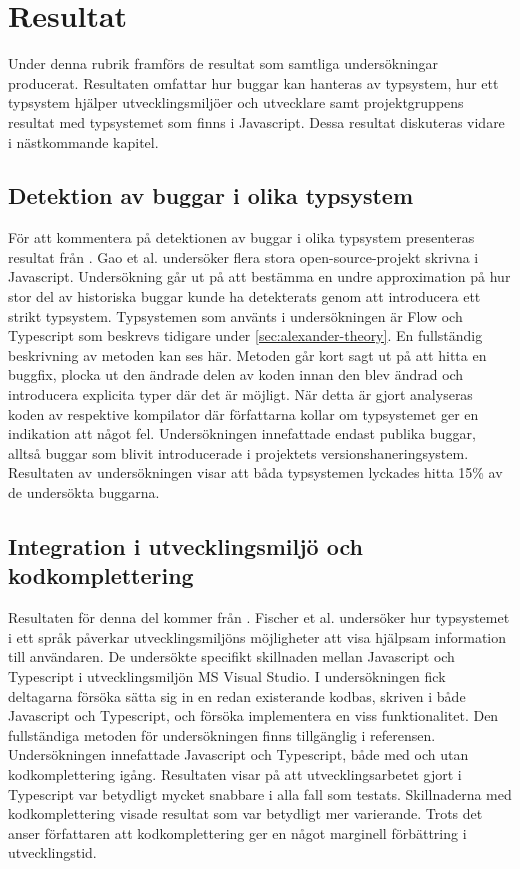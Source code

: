 \section{Resultat}
\label{sec:alexander-results}

Under denna rubrik framförs de resultat som samtliga undersökningar producerat. Resultaten omfattar hur buggar kan hanteras av typsystem, hur ett typsystem hjälper utvecklingsmiljöer och utvecklare samt projektgruppens resultat med typsystemet som finns i Javascript. Dessa resultat diskuteras vidare i nästkommande kapitel.

\subsection{Detektion av buggar i olika typsystem}
För att kommentera på detektionen av buggar i olika typsystem presenteras resultat från \cite{type-or-not-proceed}. Gao et al. undersöker flera stora open-source-projekt skrivna i Javascript.  Undersökning går ut på att bestämma en undre approximation på hur stor del av historiska buggar kunde ha detekterats genom att introducera ett strikt typsystem. Typsystemen som använts i undersökningen är Flow och Typescript som beskrevs tidigare under \ref{sec:alexander-theory}. En fullständig beskrivning av metoden kan ses här\cite{type-case-study}. Metoden går kort sagt ut på att hitta en buggfix, plocka ut den ändrade delen av koden innan den blev ändrad och introducera explicita typer där det är möjligt. När detta är gjort analyseras koden av respektive kompilator där författarna kollar om typsystemet ger en indikation att något fel. Undersökningen innefattade endast publika buggar, alltså buggar som blivit introducerade i projektets versionshaneringsystem. Resultaten av undersökningen visar att båda typsystemen lyckades hitta 15\% av de undersökta buggarna. 

\subsection{Integration i utvecklingsmiljö och kodkomplettering}
Resultaten för denna del kommer från \cite{Fischer:2015:EIE:2816707.2816720}. Fischer et al. undersöker hur typsystemet i ett språk påverkar utvecklingsmiljöns möjligheter att visa hjälpsam information till användaren. De undersökte specifikt skillnaden mellan Javascript och Typescript i utvecklingsmiljön MS Visual Studio. I undersökningen fick deltagarna försöka sätta sig in en redan existerande kodbas, skriven i både Javascript och Typescript, och försöka implementera en viss funktionalitet. Den fullständiga metoden för undersökningen finns tillgänglig i referensen. Undersökningen innefattade Javascript och Typescript, både med och utan kodkomplettering igång. Resultaten visar på att utvecklingsarbetet gjort i Typescript var betydligt mycket snabbare i alla fall som testats. Skillnaderna med kodkomplettering visade resultat som var betydligt mer varierande. Trots det anser författaren att kodkomplettering ger en något marginell förbättring i utvecklingstid.

